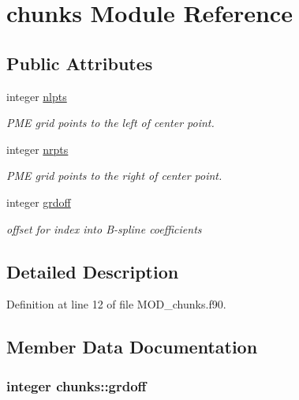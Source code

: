 \hypertarget{classchunks}{\section{chunks Module Reference}
\label{classchunks}
}
\subsection*{Public Attributes}
\begin{DoxyCompactItemize}
\item 
integer \hyperlink{classchunks_a897713dd9967aaf42ecdcead7f723585}{nlpts}
\begin{DoxyCompactList}\small\item\em P\-M\-E grid points to the left of center point. \end{DoxyCompactList}\item 
integer \hyperlink{classchunks_a95c903c94b9a1cc44aba0f942a476c0a}{nrpts}
\begin{DoxyCompactList}\small\item\em P\-M\-E grid points to the right of center point. \end{DoxyCompactList}\item 
integer \hyperlink{classchunks_a943e1df108eabe618449705c41794d68}{grdoff}
\begin{DoxyCompactList}\small\item\em offset for index into B-\/spline coefficients \end{DoxyCompactList}\end{DoxyCompactItemize}


\subsection{Detailed Description}


Definition at line 12 of file M\-O\-D\-\_\-chunks.\-f90.



\subsection{Member Data Documentation}
\hypertarget{classchunks_a943e1df108eabe618449705c41794d68}{
\subsubsection[{grdoff}]{\setlength{\rightskip}{0pt plus 5cm}integer chunks\-::grdoff}}\label{classchunks_a943e1df108eabe618449705c41794d68}


